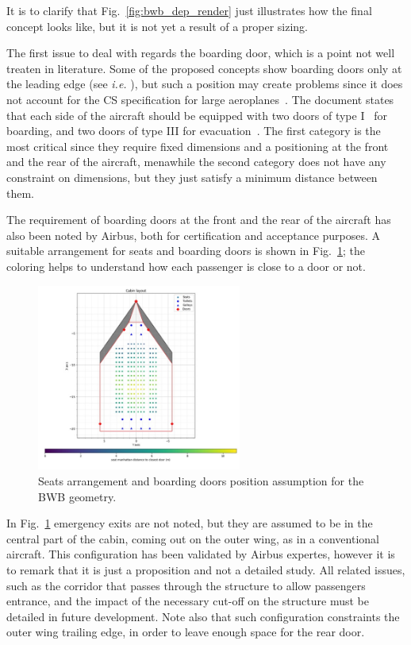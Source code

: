It is to clarify that Fig.~\ref{fig:bwb_dep_render} just illustrates how the final concept looks like, but it is not yet a result of a proper sizing. 

The first issue to deal with regards the boarding door, which is a point not well treaten in literature. 
Some of the proposed concepts show boarding doors only at the leading edge (see \textit{i.e.} \cite{bib:dzyne_bwb, bib:bwb_n3_vol1}), but such a position may create problems since it does not account for the CS specification for large aeroplanes~\cite{bib:cs_evacuation}. 
The document states that each side of the aircraft should be equipped with two doors of type I~\cite{bib:roskam_partIII} for boarding, and two doors of type III for evacuation~\cite{bib:roskam_partIII}. 
The first category is the most critical since they require fixed dimensions and a positioning at the front and the rear of the aircraft, menawhile the second category does not have any constraint on dimensions, but they just satisfy a minimum distance between them. 

The requirement of boarding doors at the front and the rear of the aircraft has also been noted by Airbus, both for certification and acceptance purposes. 
A suitable arrangement for seats and boarding doors is shown in Fig.~\ref{fig:bwb_boarding_door_position}; the coloring helps to understand how each passenger is close to a door or not. 
\begin{figure}[!h]
	\centering
	\includegraphics[keepaspectratio, width=0.6\textwidth]{images/chap4/bwb_boarding_door_position.jpg}
	\caption{Seats arrangement and boarding doors position assumption for the BWB geometry.}
	\label{fig:bwb_boarding_door_position}
\end{figure}
In Fig.~\ref{fig:bwb_boarding_door_position} emergency exits are not noted, but they are assumed to be in the central part of the cabin, coming out on the outer wing, as in a conventional aircraft. 
This configuration has been validated by Airbus expertes, however it is to remark that it is just a proposition and not a detailed study. 
All related issues, such as the corridor that passes through the structure to allow passengers entrance, and the impact of the necessary cut-off on the structure must be detailed in future development. 
Note also that such configuration constraints the outer wing trailing edge, in order to leave enough space for the rear door. 


